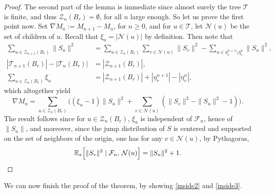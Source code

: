 \documentclass[JEP,XML,SOM,Unicode,NoFloatCountersInSection,published]{cedram}
\theoremstyle{plain}
\theoremstyle{definition}
\newcommand{\1}{{\text{\Large $\mathfrak 1$}}}
\begin{document}
\begin{proof}
The second part of the lemma is immediate
since almost surely the tree $\mathcal T$ is finite, and thus $\mathcal Z_n(B_r)= \emptyset$,
for all $n$ large enough.
So let us prove the first point now. Set $\nabla M_n := M_{n+1}- M_n$,
for $n\ge 0$, and for $u\in \mathbf{\mathcal T}$,
let $\mathcal N(u)$ be the set of children of $u$.
Recall that $\xi_u = |\mathcal N(u)|$ by definition.
Then note that
\begin{align*}
\sum_{u\in \mathcal Z_{n+1}(B_r)} \|S_u\|^2 &= \sum_{u\in \mathcal Z_n(B_r)} \sum_{v\in \mathcal N(u)} \|S_v\|^2 -
\sum_{u\in \eta_r^{n+1}\setminus \eta_r^n} \|S_u\|^2, \\
|\mathcal T_{n+1}(B_r)| -|\mathcal T_n(B_r)| &= |\mathcal Z_{n+1}(B_r)|, \\
\sum_{u\in \mathcal Z_n(B_r)} \xi_u &= |\mathcal Z_{n+1}(B_r)| + |\eta_r^{n+1}| - |\eta_r^n|,
\end{align*}
which altogether yield
\begin{equation}\label{nablaM}
\nabla M_n = \sum_{u\in \mathcal Z_n(B_r)} \Big((\xi_u - 1) \|S_u\|^2 + \sum_{v\in \mathcal N(u)} (\|S_v\|^2 - \|S_u\|^2-1)\Big).
\end{equation}
The result follows since for $u \in \mathcal Z_n(B_r)$,
$\xi_u$ is independent of $\mathcal F_n$, hence of $\|S_u\|$, and moreover, since the jump
distribution of $S$ is centered and supported on the set of
neighbors of the origin, one has for any $v\in \mathcal N(u)$, by Pythagoras,
\[
\mathbb E_x\Big[ \|S_v\|^2 \mid \mathcal F_n, \, \mathcal N(u)\Big] = \|S_u\|^2 + 1.\qedhere
\]
\end{proof}

We can now finish the proof of the theorem,
by showing \eqref{inside2} and \eqref{inside3}.
\end{document}
